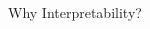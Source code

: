 \documentclass[11pt,compress,t,notes=noshow, aspectratio=169, xcolor=table]{beamer}
\begin{document}
\begin{frame}{Why Interpretability?}
\begin{columns}[T, totalwidth=\textwidth]
\begin{column}{0.2\textwidth}
    \end{column}
    \end{columns}
\end{frame}
	
\end{document}
